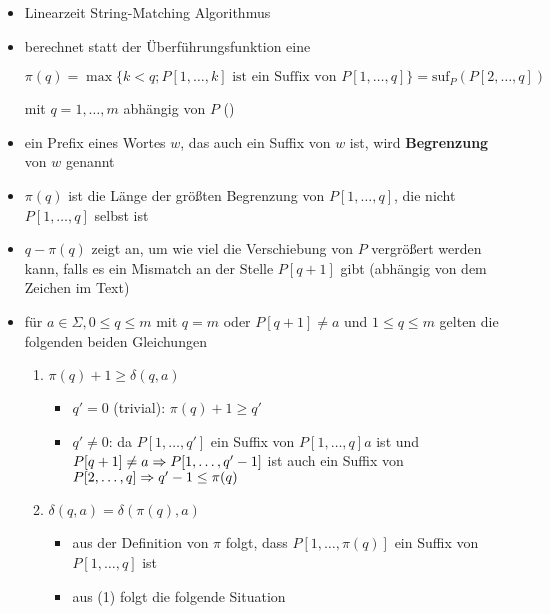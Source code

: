 \vspace*{-0.5\baselineskip}\begin{itemize}[itemsep=-2pt]
	\item Linearzeit String-Matching Algorithmus
	\item berechnet statt der Überführungsfunktion eine \textbf{\bound}
		\begin{center}
		$\pi(q) = \max\{k<q;P[1,\dots,k]\text{ ist ein Suffix von }P[1,\dots,q]\}=\text{suf}_P(P[2,\dots,q])$\end{center}
	mit $q=1,\dots,m$ abhängig von $P$ ()
	\item ein Prefix eines Wortes $w$, das auch ein Suffix von $w$ ist, wird \textbf{Begrenzung} von $w$ genannt
	\item $\pi(q)$ ist die Länge der größten Begrenzung von $P[1,\dots,q]$, die nicht $P[1,\dots,q]$ selbst ist
	\item $q-\pi(q)$ zeigt an, um wie viel die Verschiebung von $P$ vergrößert werden kann, falls es ein Mismatch an der Stelle $P[q+1]$ gibt (abhängig von dem Zeichen im Text)
	\item für $a\in \Sigma, 0\leq q\leq m$ mit $q=m$ oder $P[q+1]\neq a$ und $1\leq q\leq m$ gelten die folgenden beiden Gleichungen
		\begin{enumerate}
			\item $\pi(q)+1\geq \delta(q,a)$
				\vspace*{-1.5\baselineskip}\Proof\up
					\begin{itemize}
						\item $q'=0$ (trivial): $\pi(q)+1\geq q'$
						\item $q'\neq 0$: da $P[1,\dots,q']$ ein Suffix von $P[1,\dots,q]a$ ist und $P[q+1]\neq a\\
						\Rightarrow P[1,\dots,q'-1]$ ist auch ein Suffix von $P[2,\dots,q]\\
						\Rightarrow q'-1 \leq \pi(q)$
					\end{itemize}
			\item $\delta(q,a)=\delta(\pi(q),a)$
				\vspace*{-1.5\baselineskip}\Proof\up
					\begin{itemize}
						\item aus der Definition von $\pi$ folgt, dass $P[1,\dots,\pi(q)]$ ein Suffix von $P[1,\dots, q]$ ist
						\item aus (1) folgt die folgende Situation\\

\end{itemize}
\end{enumerate}
\end{itemize}
